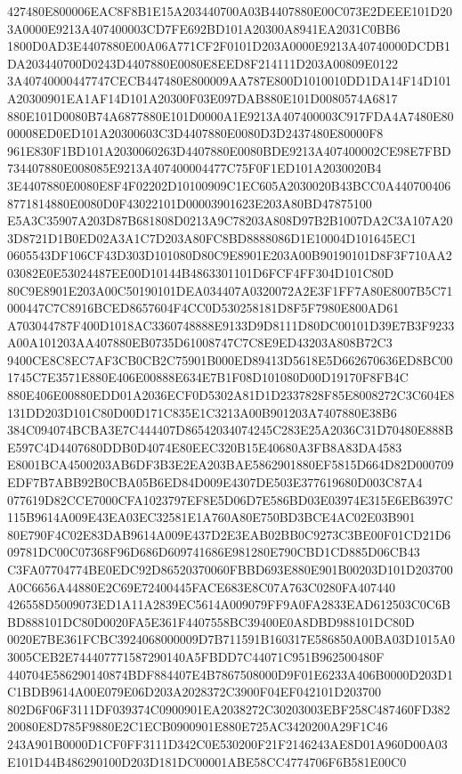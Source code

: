 \documentclass[UTF8,fontset=fandol,zihao=-4,a4paper]{ctexart}
\begin{document}
{{427480E800006EAC8F8B1E15A203440700A03B4407880E00C073E2DEEE101D203A0000E9213A407400003CD7FE692BD101A20300A8941EA2031C0BB6
1800D0AD3E4407880E00A06A771CF2F0101D203A0000E9213A40740000DCDB1DA203440700D0243D4407880E0080E8EED8F214111D203A00809E0122
3A40740000447747CECB447480E800009AA787E800D1010010DD1DA14F14D101A20300901EA1AF14D101A20300F03E097DAB880E101D0080574A6817
880E101D0080B74A6877880E101D0000A1E9213A407400003C917FDA4A7480E8000008ED0ED101A20300603C3D4407880E0080D3D2437480E80000F8
961E830F1BD101A2030060263D4407880E0080BDE9213A407400002CE98E7FBD734407880E008085E9213A407400004477C75F0F1ED101A2030020B4
3E4407880E0080E8F4F02202D10100909C1EC605A2030020B43BCC0A4407004068771814880E0080D0F43022101D00003901623E203A80BD47875100
E5A3C35907A203D87B681808D0213A9C78203A808D97B2B1007DA2C3A107A203D8721D1B0ED02A3A1C7D203A80FC8BD8888086D1E10004D101645EC1
0605543DF106CF43D303D101080D80C9E8901E203A00B90190101D8F3F710AA203082E0E53024487EE00D10144B4863301101D6FCF4FF304D101C80D
80C9E8901E203A00C50190101DEA034407A0320072A2E3F1FF7A80E8007B5C71000447C7C8916BCED8657604F4CC0D530258181D8F5F7980E800AD61
A703044787F400D1018AC3360748888E9133D9D8111D80DC00101D39E7B3F9233A00A101203AA407880EB0735D61008747C7C8E9ED43203A808B72C3
9400CE8C8EC7AF3CB0CB2C75901B000ED89413D5618E5D662670636ED8BC001745C7E3571E880E406E00888E634E7B1F08D101080D00D19170F8FB4C
880E406E00880EDD01A2036ECF0D5302A81D1D2337828F85E8008272C3C604E8131DD203D101C80D00D171C835E1C3213A00B901203A7407880E38B6
384C094074BCBA3E7C444407D86542034074245C283E25A2036C31D70480E888BE597C4D4407680DDB0D4074E80EEC320B15E40680A3FB8A83DA4583
E8001BCA4500203AB6DF3B3E2EA203BAE5862901880EF5815D664D82D000709EDF7B7ABB92B0CBA05B6ED84D009E4307DE503E377619680D003C87A4
077619D82CCE7000CFA1023797EF8E5D06D7E586BD03E03974E315E6EB6397C115B9614A009E43EA03EC32581E1A760A80E750BD3BCE4AC02E03B901
80E790F4C02E83DAB9614A009E437D2E3EAB02BB0C9273C3BE00F01CD21D609781DC00C07368F96D686D609741686E981280E790CBD1CD885D06CB43
C3FA07704774BE0EDC92D86520370060FBBD693E880E901B00203D101D203700A0C6656A44880E2C69E72400445FACE683E8C07A763C0280FA407440
426558D5009073ED1A11A2839EC5614A009079FF9A0FA2833EAD612503C0C6BBD888101DC80D0020FA5E361F4407558BC39400E0A8DBD988101DC80D
0020E7BE361FCBC3924068000009D7B711591B160317E586850A00BA03D1015A03005CEB2E744407771587290140A5FBDD7C44071C951B962500480F
440704E586290140874BDF884407E4B7867508000D9F01E6233A406B0000D203D1C1BDB9614A00E079E06D203A2028372C3900F04EF042101D203700
802D6F06F3111DF039374C0900901EA2038272C30203003EBF258C487460FD38220080E8D785F9880E2C1ECB0900901E880E725AC3420200A29F1C46
243A901B0000D1CF0FF3111D342C0E530200F21F2146243AE8D01A960D00A03E101D44B486290100D203D181DC00001ABE58CC4774706F6B581E00C0
}}
\end{document}
